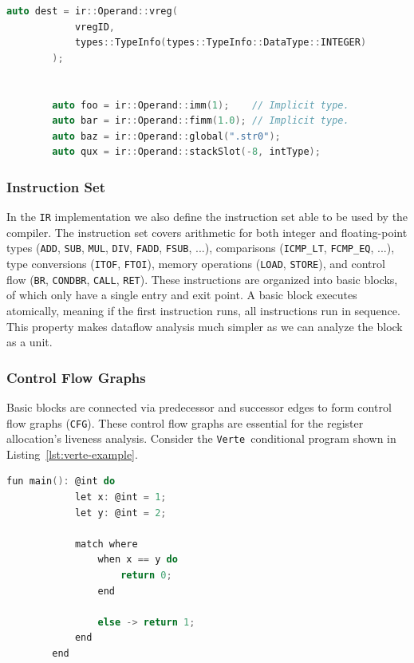 \documentclass[11pt]{article}
\newcommand{\constant}[1]{\texttt{#1}}
\newcommand{\verte}{\texttt{Verte}}
\newcommand{\lstref}[1]{Listing~\ref{#1}}
\begin{document}
\begin{lstlisting}[language=C++, caption={Operand Creation with Type Information}, label={lst:operand-creation}]
		auto dest = ir::Operand::vreg(
    		vregID,
    		types::TypeInfo(types::TypeInfo::DataType::INTEGER)
		);
		

		auto foo = ir::Operand::imm(1);    // Implicit type.   
		auto bar = ir::Operand::fimm(1.0); // Implicit type.
		auto baz = ir::Operand::global(".str0");
		auto qux = ir::Operand::stackSlot(-8, intType);
	\end{lstlisting}

\subsubsection{Instruction Set}

In the \constant{IR} implementation we also define the instruction set able to be used by the compiler. The instruction set covers arithmetic for both integer and floating-point types (\constant{ADD}, \constant{SUB}, \constant{MUL}, \constant{DIV}, \constant{FADD}, \constant{FSUB}, ...), comparisons (\constant{ICMP\_LT}, \constant{FCMP\_EQ}, ...), type conversions (\constant{ITOF}, \constant{FTOI}), memory operations (\constant{LOAD}, \constant{STORE}), and control flow (\constant{BR}, \constant{CONDBR}, \constant{CALL}, \constant{RET}). These instructions are organized into basic blocks, of which only have a single entry and exit point. A basic block executes atomically, meaning if the first instruction runs, all instructions run in sequence. This property makes dataflow analysis much simpler as we can analyze the block as a unit.

\subsubsection{Control Flow Graphs}

Basic blocks are connected via predecessor and successor edges to form control flow graphs (\constant{CFG}). These control flow graphs are essential for the register allocation's liveness analysis. Consider the \verte\ conditional program shown in \lstref{lst:verte-example}.

\begin{lstlisting}[language=C, caption={Verte Conditional Example}, label={lst:verte-example}, numbers=none]
		fun main(): @int do
    		let x: @int = 1;
    		let y: @int = 2;
		
    		match where
        		when x == y do
            		return 0;
        		end
                
        		else -> return 1;
    		end
		end
	\end{lstlisting}
\end{document}
